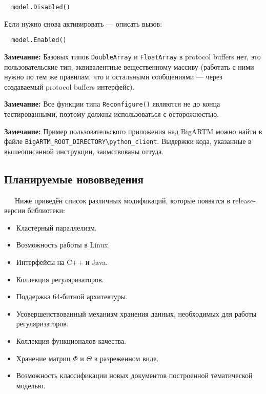 \begin{enumerate}
	\vspace{5pt}

	\verb|  model.Disabled()| 
	        
	\vspace{5pt}
	
	Если нужно снова активировать --- описать вызов:	
	
	\vspace{5pt}

	\verb|  model.Enabled()| 
	        
	\vspace{5pt}	
	
\end{enumerate}

{\bf Замечание:} Базовых типов \verb'DoubleArray' и \verb'FloatArray' в protocol buffers нет, это пользовательские тип, эквивалентные вещественному массиву (работать с ними нужно по тем же правилам, что и остальными сообщениями --- через создаваемый protocol buffers интерфейс).

{\bf Замечание:} Все функции типа \verb|Reconfigure()| являются не до конца тестированными, поэтому должны использоваться с осторожностью.

{\bf Замечание:} Пример пользовательского приложения над BigARTM можно найти в файле \verb|BigARTM_ROOT_DIRECTORY\python_client|. Выдержки кода, указанные в вышеописанной инструкции, заимствованы оттуда.

\subsection{Планируемые нововведения}

$\quad\;\:$Ниже приведён список различных модификаций, которые появятся в release-версии библиотеки:

\begin{itemize}
	\item Кластерный параллелизм.
	\item Возможность работы в Linux.
	\item Интерфейсы на C++ и Java.
	\item Коллекция регуляризаторов.
	\item Поддержка 64-битной архитектуры.
	\item Усовершенствованный механизм хранения данных, необходимых для работы регуляризаторов.
	\item Коллекция функционалов качества.
	\item Хранение матриц $\Phi$ и $\Theta$ в разреженном виде.
	\item Возможность классификации новых документов построенной тематической моделью.
\end{itemize}